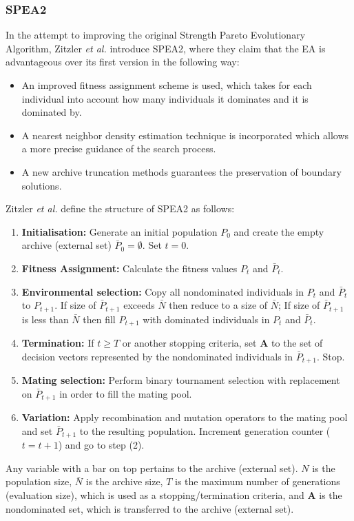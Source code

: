 \documentclass[sigconf, nonacm, preprint]{acmart}
\begin{document}
\subsubsection{SPEA2} \label{Background_spea2}
In the attempt to improving the original Strength Pareto Evolutionary Algorithm, Zitzler \textit{et al.} \cite{zitzler2001} introduce SPEA2, where they claim that the EA is advantageous over its first version in the following way:
\begin{itemize}
    \item An improved fitness assignment scheme is used, which takes for each individual into account how many individuals it dominates and it is dominated by.
    \item A nearest neighbor density estimation technique is incorporated which allows a more precise guidance of the search process.
    \item A new archive truncation methods guarantees the preservation of boundary solutions.
\end{itemize}
Zitzler \textit{et al.} \cite{zitzler2001} define the structure of SPEA2 as follows:
\begin{enumerate}
    \item \textbf{Initialisation: }Generate an initial population $P_{0}$ and create the empty archive (external set) $\bar{P}_{0} = \emptyset$. Set $t=0$.
    \item \textbf{Fitness Assignment:} Calculate the fitness values $P_{t}$ and $\bar{P}_{t}$.
    \item \textbf{Environmental selection:} Copy all nondominated individuals in $P_{t}$ and $\bar{P}_{t}$ to $P_{t+1}$. If size of $\bar{P}_{t+1}$ exceeds $\bar{N}$ then reduce to a size of $\bar{N}$; If size of $\bar{P}_{t+1}$ is less than $\bar{N}$ then fill $P_{t+1}$ with dominated individuals in $P_{t}$ and $\bar{P}_{t}$.
    \item \textbf{Termination:} If $t \geq T$ or another stopping criteria, set \textbf{A} to the set of decision vectors represented by the nondominated individuals in $\bar{P}_{t+1}$. Stop.
    \item \textbf{Mating selection:} Perform binary tournament selection with replacement on $\bar{P}_{t+1}$ in order to fill the mating pool.
    \item \textbf{Variation:} Apply recombination and mutation operators to the mating pool and set $\bar{P}_{t+1}$ to the resulting population. Increment generation counter ($t=t+1$) and go to step (2).
\end{enumerate}
Any variable with a bar on top pertains to the archive (external set). $N$ is the population size, $\bar{N}$ is the archive size, $T$ is the maximum number of generations (evaluation size), which is used as a stopping/termination criteria, and $\textbf{A}$ is the nondominated set, which is transferred to the archive (external set).
\end{document}
